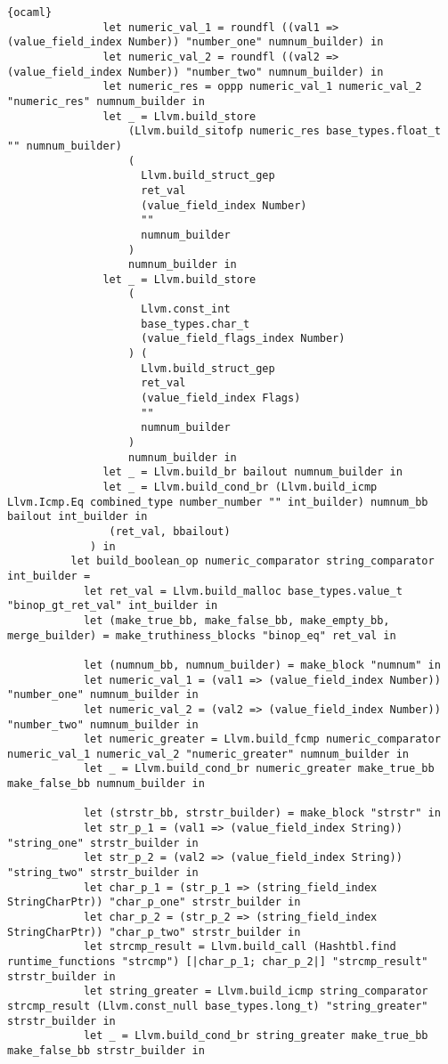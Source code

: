 \begin{lstlisting}{ocaml}
               let numeric_val_1 = roundfl ((val1 => (value_field_index Number)) "number_one" numnum_builder) in
               let numeric_val_2 = roundfl ((val2 => (value_field_index Number)) "number_two" numnum_builder) in
               let numeric_res = oppp numeric_val_1 numeric_val_2 "numeric_res" numnum_builder in
               let _ = Llvm.build_store
                   (Llvm.build_sitofp numeric_res base_types.float_t "" numnum_builder)
                   (
                     Llvm.build_struct_gep
                     ret_val
                     (value_field_index Number)
                     ""
                     numnum_builder
                   )
                   numnum_builder in
               let _ = Llvm.build_store
                   (
                     Llvm.const_int
                     base_types.char_t
                     (value_field_flags_index Number)
                   ) (
                     Llvm.build_struct_gep
                     ret_val
                     (value_field_index Flags)
                     ""
                     numnum_builder
                   )
                   numnum_builder in
               let _ = Llvm.build_br bailout numnum_builder in
               let _ = Llvm.build_cond_br (Llvm.build_icmp Llvm.Icmp.Eq combined_type number_number "" int_builder) numnum_bb bailout int_builder in
                (ret_val, bbailout)
             ) in
          let build_boolean_op numeric_comparator string_comparator int_builder =
            let ret_val = Llvm.build_malloc base_types.value_t "binop_gt_ret_val" int_builder in
            let (make_true_bb, make_false_bb, make_empty_bb, merge_builder) = make_truthiness_blocks "binop_eq" ret_val in

            let (numnum_bb, numnum_builder) = make_block "numnum" in
            let numeric_val_1 = (val1 => (value_field_index Number)) "number_one" numnum_builder in
            let numeric_val_2 = (val2 => (value_field_index Number)) "number_two" numnum_builder in
            let numeric_greater = Llvm.build_fcmp numeric_comparator numeric_val_1 numeric_val_2 "numeric_greater" numnum_builder in
            let _ = Llvm.build_cond_br numeric_greater make_true_bb make_false_bb numnum_builder in

            let (strstr_bb, strstr_builder) = make_block "strstr" in
            let str_p_1 = (val1 => (value_field_index String)) "string_one" strstr_builder in
            let str_p_2 = (val2 => (value_field_index String)) "string_two" strstr_builder in
            let char_p_1 = (str_p_1 => (string_field_index StringCharPtr)) "char_p_one" strstr_builder in
            let char_p_2 = (str_p_2 => (string_field_index StringCharPtr)) "char_p_two" strstr_builder in
            let strcmp_result = Llvm.build_call (Hashtbl.find runtime_functions "strcmp") [|char_p_1; char_p_2|] "strcmp_result" strstr_builder in
            let string_greater = Llvm.build_icmp string_comparator strcmp_result (Llvm.const_null base_types.long_t) "string_greater" strstr_builder in
            let _ = Llvm.build_cond_br string_greater make_true_bb make_false_bb strstr_builder in


\end{lstlisting}
